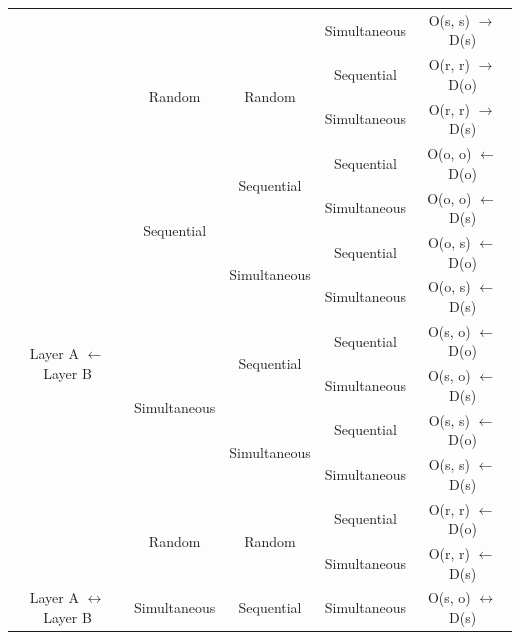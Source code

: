 \begin{table}[htp]
\begin{center}
\begin{tabular}{c|c|c|c|c}
			&                                &                                    & Simultaneous           & O(s, s) $\to$ D(s) \\  \cline{2-5}
			& \multirow{2}{*}{Random}        & \multirow{2}{*}{Random}            & Sequential             & O(r, r) $\to$ D(o) \\  \cline{4-5}
			&                                &                                    & Simultaneous           & O(r, r) $\to$ D(s) \\   \hline
			\multirow{10}{*}{Layer A $\leftarrow$ Layer B}  & \multirow{4}{*}{Sequential}    & \multirow{2}{*}{Sequential}        & Sequential             & O(o, o) $\leftarrow$ D(o) \\  \cline{4-5}  
			&                                &                                    & Simultaneous           & O(o, o) $\leftarrow$ D(s) \\  \cline{3-5}     
			&                                & \multirow{2}{*}{Simultaneous}      & Sequential             & O(o, s) $\leftarrow$ D(o) \\  \cline{4-5} 
			&                                &                                    & Simultaneous           & O(o, s) $\leftarrow$ D(s) \\  \cline{2-5} 
			& \multirow{4}{*}{Simultaneous}  & \multirow{2}{*}{Sequential}        & Sequential             & O(s, o) $\leftarrow$ D(o) \\  \cline{4-5}
			&                                &                                    & Simultaneous           & O(s, o) $\leftarrow$ D(s) \\  \cline{3-5}
			&                                & \multirow{2}{*}{Simultaneous}      & Sequential             & O(s, s) $\leftarrow$ D(o) \\  \cline{4-5}
			&                                &                                    & Simultaneous           & O(s, s) $\leftarrow$ D(s) \\  \cline{2-5}
			& \multirow{2}{*}{Random}        & \multirow{2}{*}{Random}            & Sequential             & O(r, r) $\leftarrow$ D(o) \\  \cline{4-5}
			&                                &                                    & Simultaneous           & O(r, r) $\leftarrow$ D(s) \\   \hline
			\multirow{2}{*}{Layer A $\leftrightarrow$ Layer B}& \multirow{2}{*}{Simultaneous}& Sequential                         & Simultaneous           & O(s, o) $\leftrightarrow$ D(s) \\ \cline{3-5}

\end{tabular}
\end{center}
\end{table}
